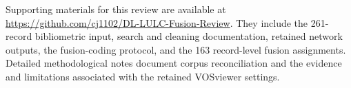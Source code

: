 \documentclass[]{interact}
\theoremstyle{plain}%
\theoremstyle{definition}
\theoremstyle{remark}
\DeclareRobustCommand{\DIFadd}[1]{{\protect\color{DIFaddcolor}\uwave{#1}}}
\def\DIFadd#1{#1}%
\begin{document}
\DIFadd{Supporting} \DIFadd{materials} \DIFadd{for} \DIFadd{this} \DIFadd{review} \DIFadd{are} \DIFadd{available} \DIFadd{at} {\color{blue}\url{https://github.com/cj1102/DL-LULC-Fusion-Review}}\DIFadd{.} \DIFadd{They} \DIFadd{include} \DIFadd{the} \DIFadd{261-record} \DIFadd{bibliometric} \DIFadd{input}\DIFadd{,} \DIFadd{search} \DIFadd{and} \DIFadd{cleaning} \DIFadd{documentation}\DIFadd{,} \DIFadd{retained} \DIFadd{network} \DIFadd{outputs}\DIFadd{,} \DIFadd{the} \DIFadd{fusion-coding} \DIFadd{protocol}\DIFadd{,} \DIFadd{and} \DIFadd{the} \DIFadd{163} \DIFadd{record-level} \DIFadd{fusion} \DIFadd{assignments}\DIFadd{.} \DIFadd{Detailed} \DIFadd{methodological} \DIFadd{notes} \DIFadd{document} \DIFadd{corpus} \DIFadd{reconciliation} \DIFadd{and} \DIFadd{the} \DIFadd{evidence} \DIFadd{and} \DIFadd{limitations} \DIFadd{associated} \DIFadd{with} \DIFadd{the} \DIFadd{retained} \DIFadd{VOSviewer} \DIFadd{settings}\DIFadd{.}
\end{document}
